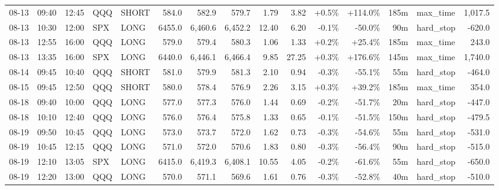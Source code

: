\documentclass[11pt,a4paper,twoside]{article}
\begin{document}
\begin{landscape}
\begin{center}
\begin{longtable}{>{\color{txtmain}}l l l l l r r r r r r r r >{\color{txtmain}}l r}
08-13 & 09:40 & 12:45 & QQQ & SHORT & 584.0 & 582.9 & 579.7 & 1.79 & 3.82 & \textcolor{wingreen}{+0.5\%} & \textcolor{wingreen}{+114.0\%} & 185m & max\_time & \textcolor{wingreen}{1,017.5} \\
08-13 & 10:30 & 12:00 & SPX & LONG & 6455.0 & 6,460.6 & 6,452.2 & 12.40 & 6.20 & \textcolor{lossred}{-0.1\%} & \textcolor{lossred}{-50.0\%} & 90m & hard\_stop & \textcolor{lossred}{-620.0} \\
08-13 & 12:55 & 16:00 & QQQ & LONG & 579.0 & 579.4 & 580.3 & 1.06 & 1.33 & \textcolor{wingreen}{+0.2\%} & \textcolor{wingreen}{+25.4\%} & 185m & max\_time & \textcolor{wingreen}{243.0} \\
08-13 & 13:35 & 16:00 & SPX & LONG & 6440.0 & 6,446.1 & 6,466.4 & 9.85 & 27.25 & \textcolor{wingreen}{+0.3\%} & \textcolor{wingreen}{+176.6\%} & 145m & max\_time & \textcolor{wingreen}{1,740.0} \\
08-14 & 09:45 & 10:40 & QQQ & SHORT & 581.0 & 579.9 & 581.3 & 2.10 & 0.94 & \textcolor{lossred}{-0.3\%} & \textcolor{lossred}{-55.1\%} & 55m & hard\_stop & \textcolor{lossred}{-464.0} \\
08-15 & 09:45 & 12:50 & QQQ & SHORT & 580.0 & 578.4 & 576.9 & 2.26 & 3.15 & \textcolor{wingreen}{+0.3\%} & \textcolor{wingreen}{+39.2\%} & 185m & max\_time & \textcolor{wingreen}{354.0} \\
08-18 & 09:40 & 10:00 & QQQ & LONG & 577.0 & 577.3 & 576.0 & 1.44 & 0.69 & \textcolor{lossred}{-0.2\%} & \textcolor{lossred}{-51.7\%} & 20m & hard\_stop & \textcolor{lossred}{-447.0} \\
08-18 & 10:10 & 12:40 & QQQ & LONG & 576.0 & 576.4 & 575.8 & 1.33 & 0.65 & \textcolor{lossred}{-0.1\%} & \textcolor{lossred}{-51.5\%} & 150m & hard\_stop & \textcolor{lossred}{-479.5} \\
08-19 & 09:50 & 10:45 & QQQ & LONG & 573.0 & 573.7 & 572.0 & 1.62 & 0.73 & \textcolor{lossred}{-0.3\%} & \textcolor{lossred}{-54.6\%} & 55m & hard\_stop & \textcolor{lossred}{-531.0} \\
08-19 & 10:45 & 12:15 & QQQ & LONG & 571.0 & 572.0 & 570.6 & 1.83 & 0.80 & \textcolor{lossred}{-0.3\%} & \textcolor{lossred}{-56.4\%} & 90m & hard\_stop & \textcolor{lossred}{-515.0} \\
08-19 & 12:10 & 13:05 & SPX & LONG & 6415.0 & 6,419.3 & 6,408.1 & 10.55 & 4.05 & \textcolor{lossred}{-0.2\%} & \textcolor{lossred}{-61.6\%} & 55m & hard\_stop & \textcolor{lossred}{-650.0} \\
08-19 & 12:20 & 13:00 & QQQ & LONG & 570.0 & 571.1 & 569.6 & 1.61 & 0.76 & \textcolor{lossred}{-0.3\%} & \textcolor{lossred}{-52.8\%} & 40m & hard\_stop & \textcolor{lossred}{-510.0} \\

\end{longtable}
\end{center}
\end{landscape}
\end{document}
